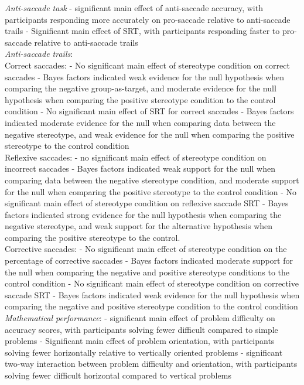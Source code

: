 \documentclass[
  doc, a4paper]{apa7}
\begin{document}
\emph{Anti-saccade task}
- significant main effect of anti-saccade accuracy, with participants responding more accurately on pro-saccade relative to anti-saccade trails
- Significant main effect of SRT, with participants responding faster to pro-saccade relative to anti-saccade trails\\
\emph{Anti-saccade trails}:\\
Correct saccades:
- No significant main effect of stereotype condition on correct saccades
- Bayes factors indicated weak evidence for the null hypothesis when comparing the negative group-as-target, and moderate evidence for the null hypothesis when comparing the positive stereotype condition to the control condition
- No significant main effect of SRT for correct saccades
- Bayes factors indicated moderate evidence for the null when comparing data between the negative stereotype, and weak evidence for the null when comparing the positive stereotype to the control condition\\
Reflexive saccades:
- no significant main effect of stereotype condition on incorrect saccades
- Bayes factors indicated weak support for the null when comparing data between the negative stereotype condition, and moderate support for the null when comparing the positive stereotype to the control condition
- No significant main effect of stereotype condition on reflexive saccade SRT
- Bayes factors indicated strong evidence for the null hypothesis when comparing the negative stereotype, and weak support for the alternative hypothesis when comparing the positive stereotype to the control.\\
Corrective saccades:
- No significant main effect of stereotype condition on the percentage of corrective saccades
- Bayes factors indicated moderate support for the null when comparing the negative and positive stereotype conditions to the control condition
- No significant main effect of stereotype condition on corrective saccade SRT
- Bayes factors indicated weak evidence for the null hypothesis when comparing the negative and positive stereotype condition to the control condition\\
\emph{Mathematical performance}:
- significant main effect of problem difficulty on accuracy scores, with participants solving fewer difficult compared to simple problems
- Significant main effect of problem orientation, with participants solving fewer horizontally relative to vertically oriented problems
- significant two-way interaction between problem difficulty and orientation, with participants solving fewer difficult horizontal compared to vertical problems
\end{document}
